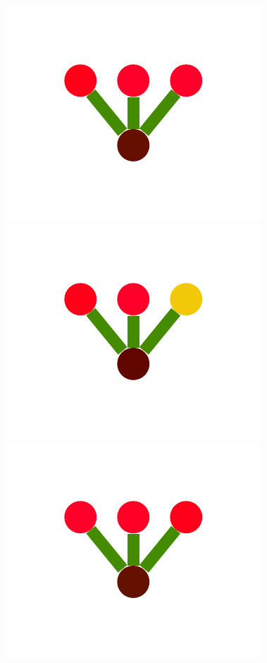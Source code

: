 \documentclass[a4paper,10pt]{article}
\begin{document}
\begin{figure}
{    \includegraphics[scale=.26]{../figures/vector/4-2-2-mergeprog-pre-3.pdf}
    \includegraphics[scale=.26]{../figures/vector/4-2-2-mergeprog-pre-4.pdf}
    \includegraphics[scale=.26]{../figures/vector/4-2-2-mergeprog-pre-5.pdf}
}
\end{figure}
\end{document}
